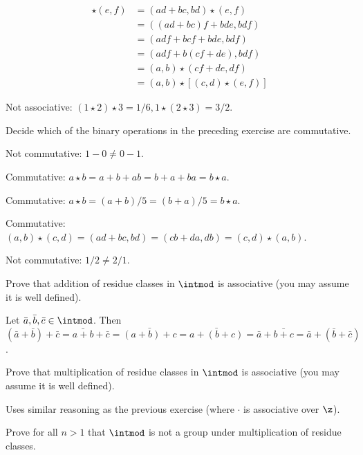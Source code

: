\begin{problems}
\begin{solalph}
        \begin{align*}
            [(a, b) \star (c, d)] \star (e, f) & = (ad + bc, bd) \star (e, f) \\
            & = ((ad + bc)f + bde, bdf) \\
            & = (adf + bcf + bde, bdf) \\
            & = (adf + b(cf + de), bdf) \\
            & = (a, b) \star (cf + de, df) \\
            & = (a, b) \star [(c, d) \star (e, f)]
        \end{align*}
        \item Not associative: $(1 \star 2) \star 3 = 1/6, 1 \star (2 \star 3) = 3/2$.
    \end{solalph}
    \item Decide which of the binary operations in the preceding exercise are commutative.
    \begin{solalph}
        \item Not commutative: $1 - 0 \neq 0 - 1$.
        \item Commutative: $a \star b = a + b + ab = b + a + ba = b \star a$.
        \item Commutative: $a \star b = (a + b)/5 = (b + a)/5 = b \star a$.
        \item Commutative: $(a, b) \star (c, d) = (ad + bc, bd) = (cb + da, db) = (c, d) \star (a, b)$.
        \item Not commutative: $1/2 \neq 2/1$.
    \end{solalph}
    \item Prove that addition of residue classes in $\intmod$ is associative (you may assume it is well defined).
    \begin{sol}
        Let $\bar a, \bar b, \bar c \in \intmod$. Then $(\bar a + \bar b) + \bar c = \bar{a + b} + \bar c = \bar{(a + b) + c} = \bar{a + (b + c)} = \bar a + \bar{b + c} = \bar a + (\bar b + \bar c)$.
    \end{sol}
    \item Prove that multiplication of residue classes in $\intmod$ is associative (you may assume it is well defined).
    \begin{sol}
        Uses similar reasoning as the previous exercise (where $\cdot$ is associative over $\z$).
    \end{sol}
    \item Prove for all $n > 1$ that $\intmod$ is not a group under multiplication of residue classes.
    \begin{sol}

\end{sol}
\end{problems}
